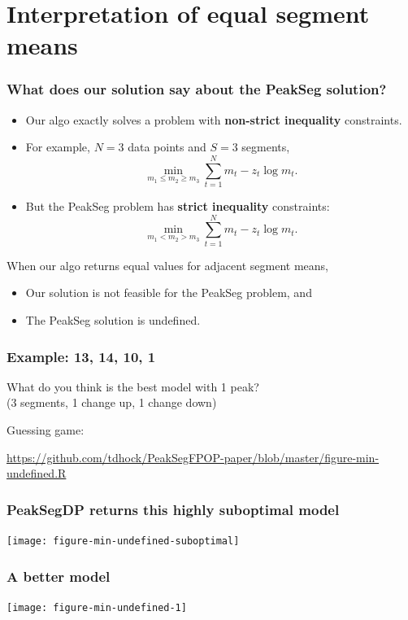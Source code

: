\documentclass{beamer}
\begin{document}
\section*{Interpretation of equal segment means}

\begin{frame}
  \frametitle{What does our solution say about the PeakSeg solution?}
  \begin{itemize}
  \item Our algo exactly solves a problem with \textbf{non-strict
      inequality} constraints.
  \item For example, $N=3$ data points and $S=3$ segments,
    \begin{equation*}
      \min_{m_1\leq m_2\geq m_3}
      \sum_{t=1}^N m_t - z_t\log m_t.
    \end{equation*}
  \item But the PeakSeg problem has \textbf{strict inequality}
    constraints:
    \begin{equation*}
      \min_{m_1<m_2 >m_3}
      \sum_{t=1}^N m_t - z_t\log m_t.
    \end{equation*}
  \end{itemize}
  When our algo returns equal values for adjacent segment means,
  \begin{itemize}
  \item Our solution is not feasible for the PeakSeg problem, and
  \item The PeakSeg solution is undefined.
  \end{itemize}
\end{frame}


\begin{frame}
  \frametitle{Example: 13, 14, 10, 1}
  What do you think is the best model with 1 peak?\\
  (3 segments, 1 change up, 1 change down)
  
  \vskip 1cm

  Guessing game:

  \url{https://github.com/tdhock/PeakSegFPOP-paper/blob/master/figure-min-undefined.R} 
\end{frame}

\begin{frame}
  \frametitle{PeakSegDP returns this highly suboptimal model}
  \texttt{[image: figure-min-undefined-suboptimal]}
\end{frame}

\begin{frame}
  \frametitle{A better model}
  \texttt{[image: figure-min-undefined-1]}
\end{frame}
\end{document}
